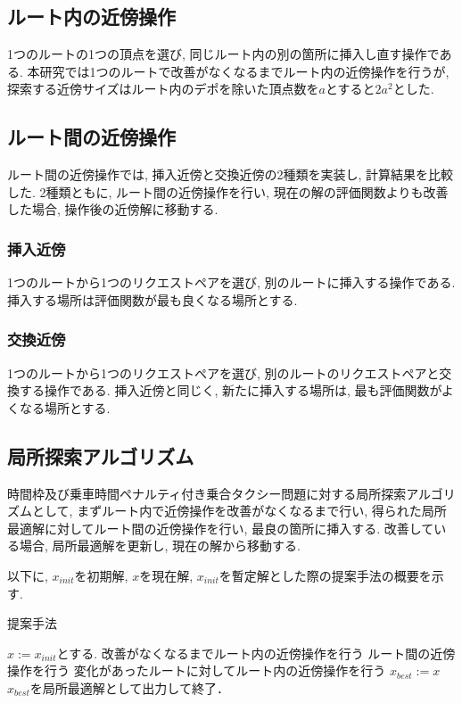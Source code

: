 \subsection{ルート内の近傍操作}
1つのルートの1つの頂点を選び, 同じルート内の別の箇所に挿入し直す操作である. 本研究では1つのルートで改善がなくなるまでルート内の近傍操作を行うが, 探索する近傍サイズはルート内のデポを除いた頂点数を$a$とすると$2a^2$とした.

\subsection{ルート間の近傍操作}
ルート間の近傍操作では, 挿入近傍と交換近傍の2種類を実装し, 計算結果を比較した. 2種類ともに, ルート間の近傍操作を行い, 現在の解の評価関数よりも改善した場合, 操作後の近傍解に移動する.
\subsubsection{挿入近傍}
1つのルートから1つのリクエストペアを選び, 別のルートに挿入する操作である. 挿入する場所は評価関数が最も良くなる場所とする.
\subsubsection{交換近傍}
1つのルートから1つのリクエストペアを選び, 別のルートのリクエストペアと交換する操作である. 挿入近傍と同じく, 新たに挿入する場所は, 最も評価関数がよくなる場所とする.
\subsection{局所探索アルゴリズム}
時間枠及び乗車時間ペナルティ付き乗合タクシー問題に対する局所探索アルゴリズムとして, まずルート内で近傍操作を改善がなくなるまで行い, 得られた局所最適解に対してルート間の近傍操作を行い, 最良の箇所に挿入する. 改善している場合, 局所最適解を更新し, 現在の解から移動する.

以下に, $x_{init}$を初期解, $x$を現在解, $x_{init}$を暫定解とした際の提案手法の概要を示す.
\begin{algorithm}
 \caption{提案手法}
 \label{algo1}
 \begin{algorithmic}[1]%
  \STATE $x := x_{init}$とする.
  \STATE 改善がなくなるまでルート内の近傍操作を行う
  \STATE ルート間の近傍操作を行う
  \STATE 変化があったルートに対してルート内の近傍操作を行う
  \STATE  $x_{best} := x$
  \ENDIF
  \STATE $x_{best}$を局所最適解として出力して終了．
 \end{algorithmic}
\end{algorithm}
